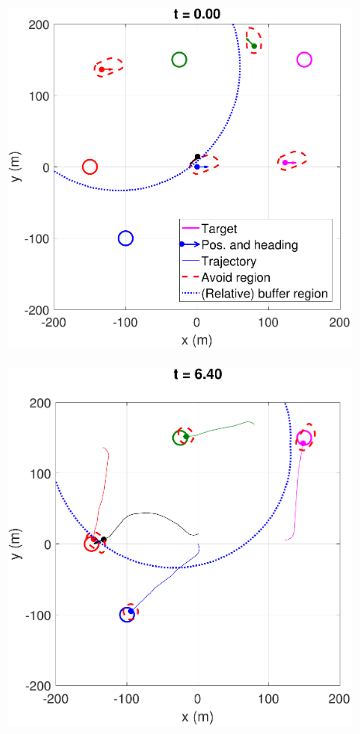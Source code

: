 \begin{figure}[H]
\begin{subfigure}{.5\columnwidth}
  \centering
  \includegraphics[width=\columnwidth]{figs/simulate_bufferRegion_properties_normal_1}
  \subcaption{}
  \label{fig:normalcase1}
\end{subfigure}%
\begin{subfigure}{.5\columnwidth}
  \centering
  \includegraphics[width=\columnwidth]{figs/simulate_bufferRegion_properties_normal_2}

\end{subfigure}
\end{figure}
